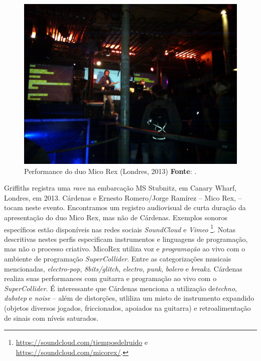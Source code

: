 \begin{figure}[!h]
  \centering
  \includegraphics[scale=0.3]{imagens/algorave.jpg}
  \caption{Performance do duo Mico Rex (Londres, 2013) \textbf{Fonte}: .}
  \label{fig:micorex}
\end{figure}

Griffiths registra uma \emph{rave} na embarcação  MS Stubnitz, em Canary Wharf, Londres, em 2013. Cárdenas e Ernesto Romero/Jorge Ramírez -- Mico Rex,  -- tocam neste evento. Encontramos um registro audiovisual de curta duração da apresentação do duo Mico Rex, mas não de Cárdenas. Exemplos sonoros específicos estão disponíveis nas redes sociais \emph{SoundCloud} e \emph{Vimeo} \footnote{\url{https://soundcloud.com/tiemposdelruido} e \url{https://soundcloud.com/micorex/}.}. Notas descritivas nestes perfis especificam instrumentos e linguagens de programação, mas não o processo criativo. MicoRex utiliza voz e \emph{programação} ao vivo com o ambiente de programação \emph{SuperCollider}. Entre as categorizações musicais mencionadas, \emph{electro-pop}, \emph{8bits/glitch}, \emph{electro}, \emph{punk}, \emph{bolero} e \emph{breakz}. Cárdenas realiza suas performances com guitarra e programação ao vivo com o \emph{SuperCollider}. É interessante que Cárdenas menciona a utilização de\emph{techno}, \emph{dubstep} e \emph{noise} -- além de distorções, utliliza um misto de instrumento expandido (objetos diversos jogados, friccionados, apoiados na guitarra) e retroalimentação de sinais com níveis saturados.  


